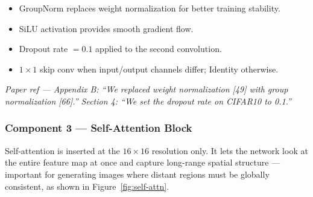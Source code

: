\documentclass{article}
\newcommand{\paperref}[1]{{\color{paperrefcolor}\emph{#1}}}
\begin{document}
\begin{itemize}
    \item GroupNorm replaces weight normalization for better training stability.
    \item SiLU activation provides smooth gradient flow.
    \item Dropout rate $= 0.1$ applied to the second convolution.
    \item $1{\times}1$ skip conv when input/output channels differ; Identity otherwise.
\end{itemize}

\paperref{Paper ref --- Appendix B: ``We replaced weight normalization [49] with group normalization [66].'' Section 4: ``We set the dropout rate on CIFAR10 to 0.1.''}

\subsubsection*{Component 3 --- Self-Attention Block}

Self-attention is inserted at the $16{\times}16$ resolution only. It lets the network look at the entire feature map at once and capture long-range spatial structure --- important for generating images where distant regions must be globally consistent, as shown in Figure~\ref{fig:self-attn}.
\end{document}
